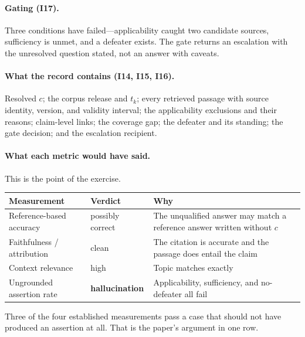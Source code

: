 \documentclass[11pt]{article}
\theoremstyle{plain}
\theoremstyle{definition}
\begin{document}
\paragraph{Gating (I17).} Three conditions have failed---applicability caught two
candidate sources, sufficiency is unmet, and a defeater exists. The gate returns an
escalation with the unresolved question stated, not an answer with caveats.

\paragraph{What the record contains (I14, I15, I16).} Resolved $c$; the corpus release
and $t_k$; every retrieved passage with source identity, version, and validity interval;
the applicability exclusions and their reasons; claim-level links; the coverage gap; the
defeater and its standing; the gate decision; and the escalation recipient.

\paragraph{What each metric would have said.} This is the point of the exercise.

\begin{center}
\small
\begin{tabular}{@{}>{\raggedright\arraybackslash}p{4.3cm}>{\raggedright\arraybackslash}p{2.5cm}>{\raggedright\arraybackslash}p{6.2cm}@{}}
\toprule
Measurement & Verdict & Why \\
\midrule
Reference-based accuracy
  & possibly correct
  & The unqualified answer may match a reference answer written without $c$ \\
\addlinespace
Faithfulness / attribution
  & clean
  & The citation is accurate and the passage does entail the claim \\
\addlinespace
Context relevance
  & high
  & Topic matches exactly \\
\addlinespace
Ungrounded assertion rate
  & \textbf{hallucination}
  & Applicability, sufficiency, and no-defeater all fail \\
\bottomrule
\end{tabular}
\end{center}

Three of the four established measurements pass a case that should not have produced an
assertion at all. That is the paper's argument in one row.




\end{document}
